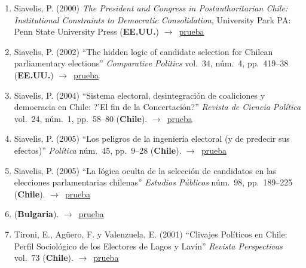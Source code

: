 \documentclass[12 pt, letter]{article}
\newenvironment{CitasMiTrabajo}{
    \begin{footnotesize}
    \begin{enumerate}[label={\footnotesize\emph{cita~\arabic*}},ref=\arabic*] %
        \setlength{\itemsep}{.1\itemsep}
        \setlength{\parskip}{.1\parskip}
    }{\end{enumerate}\end{footnotesize}}
\begin{document}
\begin{CitasMiTrabajo}
        \item Siavelis, P. (2000) \emph{The President and Congress in
        Postauthoritarian Chile: Institutional Constraints to Democratic
        Consolidation}, University Park PA: Penn State University Press
        (\textbf{EE.UU.}) $\rightarrow$~\href{https://github.com/emagar/cv/blob/master/citasMiTrab/mrs/siavelisPdtCongPostAutChi.pdf}{prueba}

        \item Siavelis, P. (2002)
        ``The hidden logic of candidate selection
        for Chilean parliamentary elections'' \emph{Comparative Politics}
        vol.\ 34, n\'um.\ 4, pp.\ 419--38 (\textbf{EE.UU.}) $\rightarrow$~\href{https://github.com/emagar/cv/blob/master/citasMiTrab/mrs/siavels2002cp.pdf}{prueba}

        \item Siavelis, P. (2004)
        ``Sistema electoral, desintegraci\'on de coaliciones y democracia en Chile: ?'El fin de la Concertaci\'on?''
        \emph{Revista de Ciencia Pol\'itica} vol.\ 24, n\'um.\ 1, pp.\ 58--80  (\textbf{Chile}). $\rightarrow$~\href{https://github.com/emagar/cv/blob/master/citasMiTrab/mrs/siavelis2004rcp.pdf}{prueba}

        \item Siavelis, P. (2005)
        ``Los peligros de la ingenier\'ia electoral (y de predecir sus efectos)''
        \emph{Pol\'itica} n\'um.\ 45, pp.\ 9--28  (\textbf{Chile}). $\rightarrow$~\href{https://github.com/emagar/cv/blob/master/citasMiTrab/mrs/siavelis2005politica.pdf}{prueba}

        \item Siavelis, P. (2005)
        ``La l\'ogica oculta de la selecci\'on de candidatos en las elecciones parlamentarias chilenas''
            \emph{Estudios P\'ublicos}
        n\'um.\ 98, pp.\ 189--225 (\textbf{Chile}). $\rightarrow$~\href{https://github.com/emagar/cv/blob/master/citasMiTrab/mrs/Siavelis2005logicaoculta.pdf}{prueba}

        \item {} (\textbf{Bulgaria}). $\rightarrow$~\href{http://ijpam.eu/contents/2008-47-4/3/3.pdf}{prueba}
        
        \item Tironi, E., Ag\"uero, F. y Valenzuela, E. (2001)
        ``Clivajes Pol\'iticos en Chile: Perfil Sociol\'ogico de los Electores de Lagos y Lav\'in''
        \emph{Revista Perspectivas} vol.\ 73 (\textbf{Chile}). $\rightarrow$~\href{https://github.com/emagar/cv/blob/master/citasMiTrab/mrs/tironietal2001.pdf}{prueba}


\end{CitasMiTrabajo}
\end{document}

